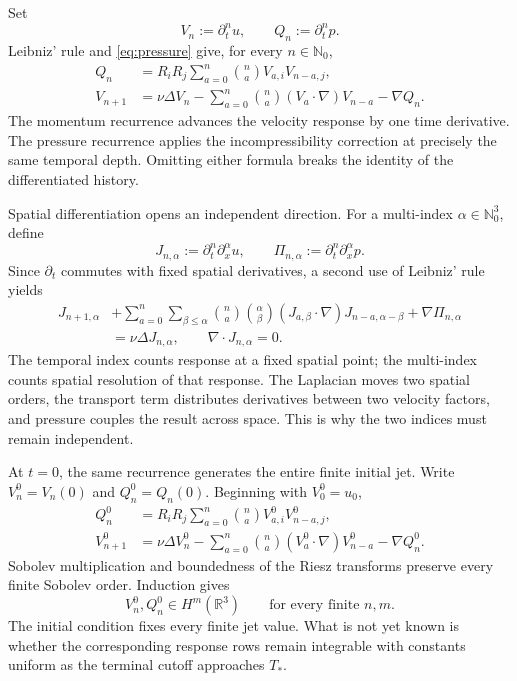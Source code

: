 \documentclass[11pt]{article}
\theoremstyle{definition}
\theoremstyle{remark}
\newcommand{\R}{\mathbb R}
\newcommand{\Nzero}{\mathbb N_0}
\begin{document}
Set
\[
 V_n:=\partial_t^n u,
 \qquad Q_n:=\partial_t^n p.
\]
Leibniz' rule and \eqref{eq:pressure} give, for every \(n\in\Nzero\),
\begin{align}
 Q_n
 &=R_iR_j\sum_{a=0}^{n}\binom na V_{a,i}V_{n-a,j},
 \label{eq:pressure-recurrence}\\
 V_{n+1}
 &=\nu\Delta V_n
 -\sum_{a=0}^{n}\binom na(V_a\cdot\nabla)V_{n-a}
 -\nabla Q_n.
 \label{eq:velocity-recurrence}
\end{align}
The momentum recurrence advances the velocity response by one time derivative.
The pressure recurrence
applies the incompressibility correction at precisely the same temporal
depth.  Omitting either formula breaks the identity of the differentiated
history.

Spatial differentiation opens an independent direction.  For a multi-index
\(\alpha\in\Nzero^3\), define
\[
 J_{n,\alpha}:=\partial_t^n\partial_x^\alpha u,
 \qquad
 \Pi_{n,\alpha}:=\partial_t^n\partial_x^\alpha p.
\]
Since \(\partial_t\) commutes with fixed spatial derivatives, a second use of
Leibniz' rule yields
\begin{equation}
\begin{aligned}
 J_{n+1,\alpha}
 &+\sum_{a=0}^{n}\sum_{\beta\leq\alpha}
 \binom na\binom\alpha\beta
 (J_{a,\beta}\cdot\nabla)J_{n-a,\alpha-\beta}
 +\nabla\Pi_{n,\alpha}
 \\
 &=\nu\Delta J_{n,\alpha},
 \qquad \nabla\cdot J_{n,\alpha}=0.
\end{aligned}
\label{eq:mixed-recurrence}
\end{equation}
The temporal index counts response at a fixed spatial point; the multi-index
counts spatial resolution of that response.  The Laplacian moves two spatial
orders, the transport term distributes derivatives between two velocity
factors, and pressure couples the result across space.  This is why the two
indices must remain independent.

At \(t=0\), the same recurrence generates the entire finite initial jet.
Write \(V_n^0=V_n(0)\) and \(Q_n^0=Q_n(0)\).  Beginning with \(V_0^0=u_0\),
\begin{align*}
 Q_n^0
 &=R_iR_j\sum_{a=0}^{n}\binom naV_{a,i}^0V_{n-a,j}^0,\\
 V_{n+1}^0
 &=\nu\Delta V_n^0
 -\sum_{a=0}^{n}\binom na(V_a^0\cdot\nabla)V_{n-a}^0
 -\nabla Q_n^0.
\end{align*}
Sobolev multiplication and boundedness of the Riesz transforms preserve every
finite Sobolev order.  Induction gives
\begin{equation}
 V_n^0,Q_n^0\in H^m(\R^3)
 \qquad\text{for every finite }n,m.
 \label{eq:initial-jet}
\end{equation}
The initial condition fixes every finite jet value.  What is not yet known is
whether the corresponding response rows remain integrable with constants
uniform as the terminal cutoff approaches \(T_*\).
\end{document}
